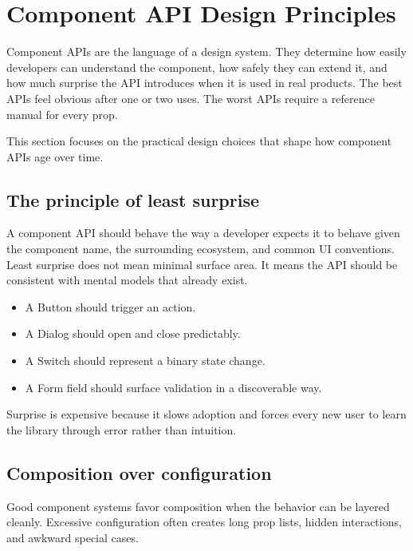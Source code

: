 \clearpage
\section{Component API Design Principles}

Component APIs are the language of a design system. They determine how easily developers can understand the component, how safely they can extend it, and how much surprise the API introduces when it is used in real products. The best APIs feel obvious after one or two uses. The worst APIs require a reference manual for every prop.

This section focuses on the practical design choices that shape how component APIs age over time.

\subsection{The principle of least surprise}
A component API should behave the way a developer expects it to behave given the component name, the surrounding ecosystem, and common UI conventions. Least surprise does not mean minimal surface area. It means the API should be consistent with mental models that already exist.

\begin{itemize}[leftmargin=*, itemsep=0.35em]
  \item A Button should trigger an action.
  \item A Dialog should open and close predictably.
  \item A Switch should represent a binary state change.
  \item A Form field should surface validation in a discoverable way.
\end{itemize}

Surprise is expensive because it slows adoption and forces every new user to learn the library through error rather than intuition.

\subsection{Composition over configuration}
Good component systems favor composition when the behavior can be layered cleanly. Excessive configuration often creates long prop lists, hidden interactions, and awkward special cases.

